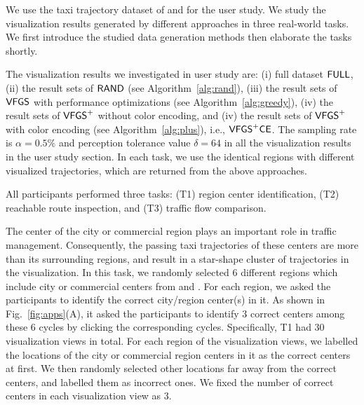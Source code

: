 We use the taxi trajectory dataset of \pt{} and \sz{} for the user study.
We study the visualization results generated by different approaches in three real-world tasks.
We first introduce the studied data generation methods then elaborate the tasks shortly.

The visualization results we investigated in user study are: (i) full dataset $\mathsf{FULL}$,
(ii) the result sets of $\mathsf{RAND}$ (see Algorithm~\ref{alg:rand}),
(iii) the result sets of $\mathsf{VFGS}$ with performance optimizations (see Algorithm~\ref{alg:greedy}),
(iv) the result sets of $\mathsf{VFGS}^{+}$ without color encoding,
and (iv) the result sets of $\mathsf{VFGS}^{+}$ with color encoding (see Algorithm~\ref{alg:plus}), i.e., $\mathsf{VFGS}^{+}\mathsf{CE}$.
The sampling rate is $\alpha = 0.5\%$ and perception tolerance value $\delta = 64$ in all the visualization results in the user study section.
In each task, we use the identical regions with different visualized trajectories, which are returned from the above approaches.


All participants performed three tasks:  (T1) region center identification, (T2) reachable route inspection, and (T3) traffic flow comparison.

The {center of the city or commercial region} plays an important role in traffic management.
Consequently, the passing taxi trajectories of these centers are more than its surrounding regions, and result in a star-shape cluster of trajectories in the visualization.
In this task, we randomly selected 6 different regions which include city or commercial centers from \pt{} and \sz{}.
For each region, we asked the participants to identify the correct city/region center(s) in it.
As shown in Fig.~\ref{fig:apps}(A), it asked the participants to identify 3 correct centers among these 6 cycles by clicking the corresponding cycles.
Specifically, T1 had 30 visualization views in total.
For each region of the visualization views,  we labelled the locations of the {city or commercial region} centers in it as the correct centers at first.	
We then randomly selected other {locations} far away from the correct centers, and labelled them as incorrect ones.
We fixed the number of correct centers in each visualization view as 3.



